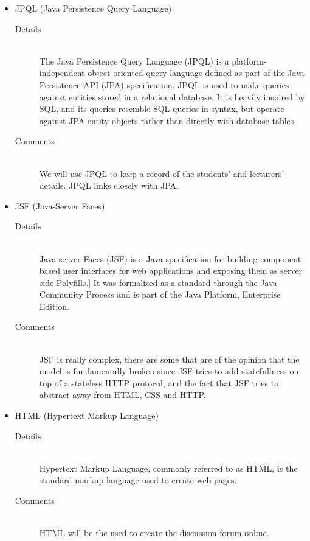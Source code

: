 \documentclass[10pt]{article}
\begin{document}
\begin{description}
\begin{itemize}
\begin{description}
					\end{description}
				\item JPQL (Java Persistence Query Language)
					\begin{description}
						\item[Details] \hfill \\
							The Java Persistence Query Language (JPQL) is a platform-independent object-oriented query language defined as part
							 of the Java Persistence API (JPA) specification. JPQL is used to make queries against entities stored in a relational database.
							 It is heavily inspired by SQL, and its queries resemble SQL queries in syntax, but operate against JPA entity objects rather
							 than directly with database tables.
						\item[Comments]\hfill \\
                                                        We will use JPQL to keep a record of the students' and lecturers' details. JPQL links closely with JPA.							
					\end{description}
				\item JSF (Java-Server Faces)
					\begin{description}
						\item[Details] \hfill \\
							Java-server Faces (JSF) is a Java specification for building component-based user interfaces for web applications and
							 exposing them as server side Polyfills.] It was formalized as a standard through the Java Community Process and is
							 part of the Java Platform, Enterprise Edition.
						\item[Comments]\hfill \\	
							JSF is really complex, there are some that are of the opinion that the model is fundamentally broken since JSF tries to
							add statefullness on top of a stateless HTTP protocol, and the fact that JSF tries to abstract away from HTML, CSS and HTTP.
					\end{description}
				\item HTML (Hypertext Markup Language)
					\begin{description}
						\item[Details] \hfill \\
							Hypertext Markup Language, commonly referred to as HTML, is the standard markup language used to create web pages.
						\item[Comments]\hfill \\
                                                        HTML will be the used to create the discussion forum online.			

\end{description}
\end{itemize}
\end{description}
\end{document}
